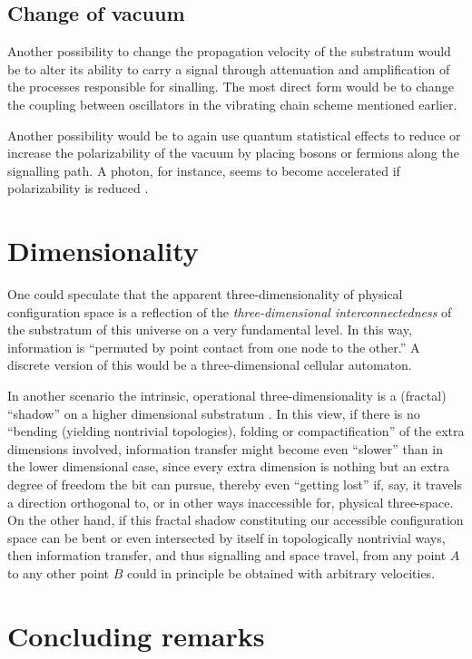 \documentclass[%
  preprint,
 showpacs,
 showkeys,
 preprintnumbers,
 amsmath,amssymb,
 aps,
  pra,
  longbibliography,
 ]{revtex4-1}
\begin{document}
\subsection{Change of vacuum}

Another possibility to change the propagation velocity of the substratum would be to alter its ability
to carry a signal through attenuation and amplification of the processes responsible for sinalling.
The most direct form would be to change the coupling between oscillators in the vibrating chain scheme mentioned earlier.

Another possibility would be to again use quantum statistical effects to reduce or increase the polarizability of the vacuum
by placing bosons or fermions along the signalling path.
A photon, for instance, seems to become accelerated if polarizability is reduced \cite{Scharnhorst-1998,svozil-putz-sol}.

\section{Dimensionality}

One could speculate that the apparent three-dimensionality of physical configuration space is
a reflection of the {\em three-dimensional interconnectedness} of the substratum of this universe
on a very fundamental level.
In this way, information is ``permuted by point contact from one node to the other.''
A discrete version of this would be a three-dimensional cellular automaton.

In another scenario the intrinsic, operational three-dimensionality
is a (fractal) ``shadow'' on a higher dimensional substratum \cite{sv4}.
In this view, if there is no ``bending (yielding nontrivial topologies), folding or compactification'' of the extra dimensions involved,
information transfer might become even ``slower'' than in the lower dimensional case, since every extra dimension is nothing but
an extra degree of freedom the bit can pursue, thereby even ``getting lost'' if, say, it travels a direction orthogonal to,
or in other ways inaccessible for, physical three-space.
On the other hand, if this fractal shadow constituting our accessible configuration space
can be bent or even intersected by itself in topologically nontrivial ways,
then information transfer, and thus signalling and space travel, from any point $A$ to any other point $B$
could in principle be obtained with arbitrary velocities.




\section{Concluding remarks}
\end{document}
